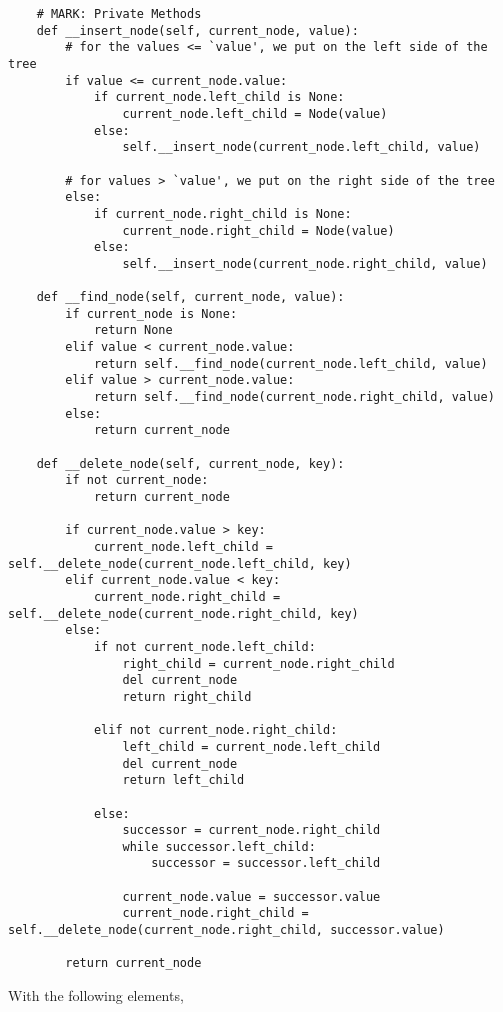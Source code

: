 \documentclass[12pt]{scrartcl}
\begin{document}
\begin{lstlisting}
    # MARK: Private Methods
    def __insert_node(self, current_node, value):
        # for the values <= `value', we put on the left side of the tree
        if value <= current_node.value:
            if current_node.left_child is None:
                current_node.left_child = Node(value)
            else:
                self.__insert_node(current_node.left_child, value)

        # for values > `value', we put on the right side of the tree
        else:
            if current_node.right_child is None:
                current_node.right_child = Node(value)
            else:
                self.__insert_node(current_node.right_child, value)

    def __find_node(self, current_node, value):
        if current_node is None:
            return None
        elif value < current_node.value:
            return self.__find_node(current_node.left_child, value)
        elif value > current_node.value:
            return self.__find_node(current_node.right_child, value)
        else:
            return current_node

    def __delete_node(self, current_node, key):
        if not current_node:
            return current_node

        if current_node.value > key:
            current_node.left_child = self.__delete_node(current_node.left_child, key)
        elif current_node.value < key:
            current_node.right_child = self.__delete_node(current_node.right_child, key)
        else:
            if not current_node.left_child:
                right_child = current_node.right_child
                del current_node
                return right_child

            elif not current_node.right_child:
                left_child = current_node.left_child
                del current_node
                return left_child

            else:
                successor = current_node.right_child
                while successor.left_child:
                    successor = successor.left_child

                current_node.value = successor.value
                current_node.right_child = self.__delete_node(current_node.right_child, successor.value)

        return current_node
\end{lstlisting}

\problem{}
With the following elements,
\end{document}
